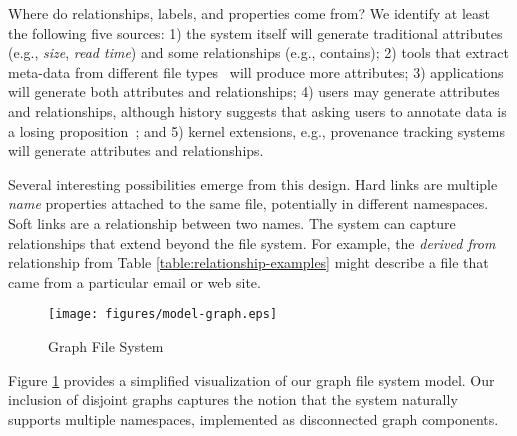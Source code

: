 Where do relationships, labels, and properties come from?
We identify at least the following five sources:
1) the system itself will generate traditional
attributes (e.g., \textit{size}, \textit{read time}) and some
relationships (e.g., contains);
2) tools that extract meta-data from different file
types~\cite{soules2004toward,bloehdorn2006tagfs} will produce more attributes;
3) applications will generate both attributes and relationships;
4) users may generate attributes and relationships, although history
suggests that asking users to annotate data is a losing
proposition~\cite{soules2003can}; and
5) kernel extensions, e.g., provenance tracking systems~\cite{pasquier17camflow}
will generate attributes and relationships.

Several interesting possibilities emerge from this design.
Hard links are multiple \textit{name} properties attached to the
same file, potentially in different namespaces.
Soft links are a relationship between two names.
The system can capture relationships that extend beyond the file system.
For example, the \textit{derived from} relationship from
Table \ref{table:relationship-examples} might describe a file that came
from a particular email or web site.

\begin{figure}[bt]
    \captionsetup{justification=centering}
\texttt{[image: figures/model-graph.eps]}
\caption{Graph File System}\label{fig:graphfs-example}
\end{figure}

Figure \ref{fig:graphfs-example} provides a simplified visualization of our graph file
system model.
Our inclusion of disjoint graphs captures the notion that the system
naturally supports multiple namespaces, implemented as disconnected graph
components.

